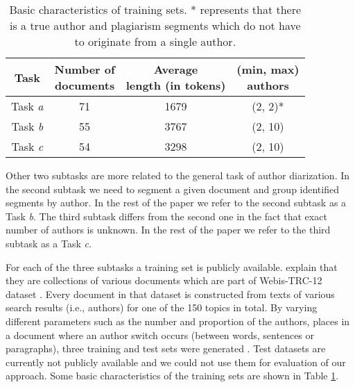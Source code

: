 \documentclass[10pt, a4paper]{article}
\begin{document}
\begin{table}
	\caption{Basic characteristics of training sets. * represents that there is a true author and plagiarism segments which do not have to originate from a single author.}
	\label{tab:dataset-characteristics}
	\begin{center}
		\begin{tabular}{cccc}
			\toprule
			Task & \thead{Number of \\ documents} & \thead{Average \\ length (in tokens)} & \thead{(min, max)\\authors} \\
			\midrule
			Task \emph{a} & 71 & 1679 & (2, 2)*\\
			Task \emph{b} & 55 & 3767 & (2, 10)\\
			Task \emph{c} & 54 & 3298 & (2, 10)\\
			\bottomrule
		\end{tabular}
	\end{center}
\end{table}

Other two subtasks are more related to the general task of author diarization. In the second subtask we need to segment a given document and group identified segments by author. In the rest of the paper we refer to the second subtask as a Task \emph{b}. The third subtask differs from the second one in the fact that exact number of authors is unknown. In the rest of the paper we refer to the third subtask as a Task \emph{c}.

For each of the three subtasks a training set is publicly available.\footnotemark[1] \citet{rosso-2016} explain that they are collections of various documents which are part of Webis-TRC-12 dataset \citep{potthast-2013}. Every document in that dataset is constructed from texts of various search results (i.e., authors) for one of the 150 topics in total. By varying different parameters such as the number and proportion of the authors, places in a document where an author switch occurs (between words, sentences or paragraphs), three training and test sets were generated \citep{rosso-2016}. Test datasets are currently not publicly available and we could not use them for evaluation of our approach. Some basic characteristics of the training sets are shown in Table \ref{tab:dataset-characteristics}.

\end{document}
